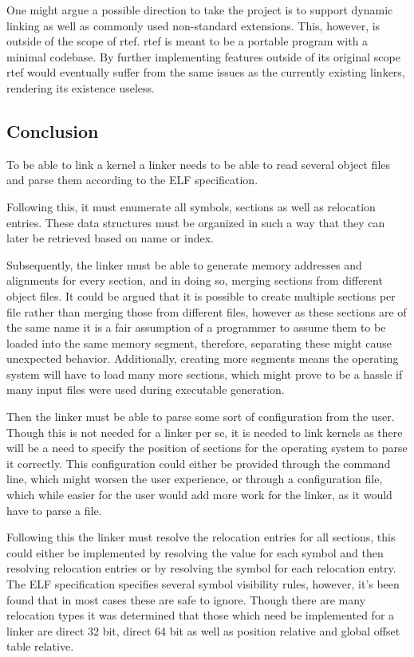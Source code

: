 \documentclass{article}
\begin{document}
One might argue a possible direction to take the project is to support dynamic linking as well as commonly used non-standard extensions. This, however, is outside of the scope of rtef. rtef is meant to be a portable program with a minimal codebase. By further implementing features outside of its original scope rtef would eventually suffer from the same issues as the currently existing linkers, rendering its existence useless.

\subsection{Conclusion}

To be able to link a kernel a linker needs to be able to read several object files and parse them according to the ELF specification.

Following this, it must enumerate all symbols, sections as well as relocation entries. These data structures must be organized in such a way that they can later be retrieved based on name or index.

Subsequently, the linker must be able to generate memory addresses and alignments for every section, and in doing so, merging sections from different object files. It could be argued that it is possible to create multiple sections per file rather than merging those from different files, however as these sections are of the same name it is a fair assumption of a programmer to assume them to be loaded into the same memory segment, therefore, separating these might cause unexpected behavior. Additionally, creating more segments means the operating system will have to load many more sections, which might prove to be a hassle if many input files were used during executable generation.

Then the linker must be able to parse some sort of configuration from the user. Though this is not needed for a linker per se, it is needed to link kernels as there will be a need to specify the position of sections for the operating system to parse it correctly. This configuration could either be provided through the command line, which might worsen the user experience, or through a configuration file, which while easier for the user would add more work for the linker, as it would have to parse a file.

Following this the linker must resolve the relocation entries for all sections, this could either be implemented by resolving the value for each symbol and then resolving relocation entries or by resolving the symbol for each relocation entry. The ELF specification specifies several symbol visibility rules, however, it's been found that in most cases these are safe to ignore. Though there are many relocation types it was determined that those which need be implemented for a linker are direct 32 bit, direct 64 bit as well as position relative and global offset table relative.
\end{document}
